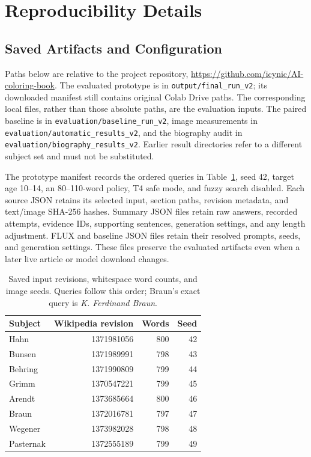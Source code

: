 \section{Reproducibility Details}
\label{app:reproducibility}

\newcommand{\ShellContinue}{{\fontfamily{lmr}\selectfont\textasciigrave}}

\subsection{Saved Artifacts and Configuration}

Paths below are relative to the project repository, \url{https://github.com/icynic/AI-coloring-book}. The evaluated prototype is in \nolinkurl{output/final_run_v2}; its downloaded manifest still contains original Colab Drive paths. The corresponding local files, rather than those absolute paths, are the evaluation inputs. The paired baseline is in \nolinkurl{evaluation/baseline_run_v2}, image measurements in \nolinkurl{evaluation/automatic_results_v2}, and the biography audit in \nolinkurl{evaluation/biography_results_v2}. Earlier result directories refer to a different subject set and must not be substituted.

The prototype manifest records the ordered queries in Table~\ref{tab:source-revisions}, seed 42, target age 10--14, an 80--110-word policy, T4 safe mode, and fuzzy search disabled. Each source JSON retains its selected input, section paths, revision metadata, and text/image SHA-256 hashes. Summary JSON files retain raw answers, recorded attempts, evidence IDs, supporting sentences, generation settings, and any length adjustment. FLUX and baseline JSON files retain their resolved prompts, seeds, and generation settings. These files preserve the evaluated artifacts even when a later live article or model download changes.

\begin{table}[h]
\centering
\small
\begin{tabular}{@{}lrrr@{}}
\hline
Subject & Wikipedia revision & Words & Seed \\
\hline
Hahn & 1371981056 & 800 & 42 \\
Bunsen & 1371989991 & 798 & 43 \\
Behring & 1371990809 & 799 & 44 \\
Grimm & 1370547221 & 799 & 45 \\
Arendt & 1373685664 & 800 & 46 \\
Braun & 1372016781 & 797 & 47 \\
Wegener & 1373982028 & 798 & 48 \\
Pasternak & 1372555189 & 799 & 49 \\
\hline
\end{tabular}
\caption{Saved input revisions, whitespace word counts, and image seeds. Queries follow this order; Braun's exact query is \emph{K. Ferdinand Braun}.}
\label{tab:source-revisions}
\end{table}

